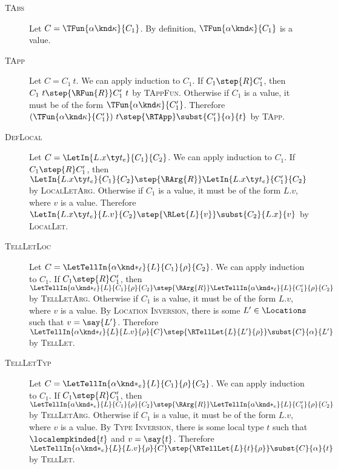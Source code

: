 \begin{description}
  \item[\textsc{TAbs}]
  Let $C = \TFun{\alpha \knd \kappa}{C_1}$.
  By definition, $\TFun{\alpha \knd \kappa}{C_1}$ is a value.

  \item[\textsc{TApp}]
  Let $C = C_1~t$.
  We can apply induction to $C_1$.
  If $C_1 \step{R} C_1'$, then $C_1~t \step{\RFun{R}} C_1'~t$ by \textsc{TAppFun}.
  Otherwise if $C_1$ is a value, it must be of the form $\TFun{\alpha \knd \kappa}{C_1'}$.
  Therefore $(\TFun{\alpha \knd \kappa}{C_1'})~t \step{\RTApp} \subst{C_1'}{\alpha}{t}$ by \textsc{TApp}.

  \item[\textsc{DefLocal}]
  Let $C = \LetIn{L.x \ty t_e}{C_1}{C_2}$.
  We can apply induction to $C_1$.
  If $C_1 \step{R} C_1'$, then $\LetIn{L.x \ty t_e}{C_1}{C_2} \step{\RArg{R}} \LetIn{L.x \ty t_e}{C_1'}{C_2}$ by \textsc{LocalLetArg}.
  Otherwise if $C_1$ is a value, it must be of the form $L.v$, where $v$ is a value.
  Therefore $\LetIn{L.x \ty t_e}{L.v}{C_2} \step{\RLet{L}{v}} \subst{C_2}{L.x}{v}$ by \textsc{LocalLet}.

  \item[\textsc{TellLetLoc}]
  Let $C = \LetTellIn{\alpha \knd *_\ell}{L}{C_1}{\rho}{C_2}$.
  We can apply induction to $C_1$.
  If $C_1 \step{R} C_1'$, then $\LetTellIn{\alpha \knd *_\ell}{L}{C_1}{\rho}{C_2} \step{\RArg{R}} \LetTellIn{\alpha \knd *_\ell}{L}{C_1'}{\rho}{C_2}$ by \textsc{TellLetArg}.
  Otherwise if $C_1$ is a value, it must be of the form $L.v$, where $v$ is a value.
  By \textsc{Location Inversion}, there is some $L' \in \Locations$ such that $v = \say{L'}$.
  Therefore $\LetTellIn{\alpha \knd *_\ell}{L}{L.v}{\rho}{C} \step{\RTellLet{L}{L'}{\rho}} \subst{C}{\alpha}{L'}$ by \textsc{TellLet}.

  \item[\textsc{TellLetTyp}]
  Let $C = \LetTellIn{\alpha \knd *_e}{L}{C_1}{\rho}{C_2}$.
  We can apply induction to $C_1$.
  If $C_1 \step{R} C_1'$, then $\LetTellIn{\alpha \knd *_e}{L}{C_1}{\rho}{C_2} \step{\RArg{R}} \LetTellIn{\alpha \knd *_e}{L}{C_1'}{\rho}{C_2}$ by \textsc{TellLetArg}.
  Otherwise if $C_1$ is a value, it must be of the form $L.v$, where $v$ is a value.
  By \textsc{Type Inversion}, there is some local type $t$ such that $\localempkinded{t}$ and $v = \say{t}$.
  Therefore $\LetTellIn{\alpha \knd *_e}{L}{L.v}{\rho}{C} \step{\RTellLet{L}{t}{\rho}} \subst{C}{\alpha}{t}$ by \textsc{TellLet}.
\end{description}


